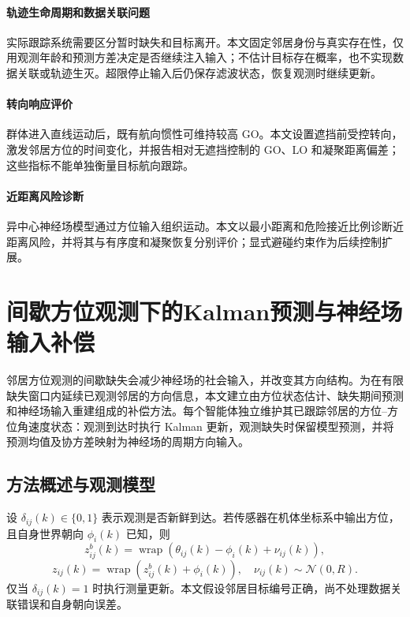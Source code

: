 \documentclass[UTF8,fontset=windows,11pt]{ctexart}
\begin{document}
\paragraph{轨迹生命周期和数据关联问题}
实际跟踪系统需要区分暂时缺失和目标离开。本文固定邻居身份与真实存在性，仅用观测年龄和预测方差决定是否继续注入输入；不估计目标存在概率，也不实现数据关联或轨迹生灭。超限停止输入后仍保存滤波状态，恢复观测时继续更新。

\paragraph{转向响应评价}
群体进入直线运动后，既有航向惯性可维持较高 GO。本文设置遮挡前受控转向，激发邻居方位的时间变化，并报告相对无遮挡控制的 GO、LO 和凝聚距离偏差；这些指标不能单独衡量目标航向跟踪。

\paragraph{近距离风险诊断}
异中心神经场模型通过方位输入组织运动。本文以最小距离和危险接近比例诊断近距离风险，并将其与有序度和凝聚恢复分别评价；显式避碰约束作为后续控制扩展。

\section{间歇方位观测下的Kalman预测与神经场输入补偿}

邻居方位观测的间歇缺失会减少神经场的社会输入，并改变其方向结构。为在有限缺失窗口内延续已观测邻居的方向信息，本文建立由方位状态估计、缺失期间预测和神经场输入重建组成的补偿方法。每个智能体独立维护其已跟踪邻居的方位--方位角速度状态：观测到达时执行 Kalman 更新，观测缺失时保留模型预测，并将预测均值及协方差映射为神经场的周期方向输入。

\subsection{方法概述与观测模型}
设 $\delta_{ij}(k)\in\{0,1\}$ 表示观测是否新鲜到达。若传感器在机体坐标系中输出方位，且自身世界朝向 $\phi_i(k)$ 已知，则
\begin{equation}
 z^b_{ij}(k)=\operatorname{wrap}(\theta_{ij}(k)-\phi_i(k)+\nu_{ij}(k)),
\end{equation}
\begin{equation}
 z_{ij}(k)=\operatorname{wrap}(z^b_{ij}(k)+\phi_i(k)),
 \quad \nu_{ij}(k)\sim\mathcal N(0,R).
\end{equation}
仅当 $\delta_{ij}(k)=1$ 时执行测量更新。本文假设邻居目标编号正确，尚不处理数据关联错误和自身朝向误差。
\end{document}
